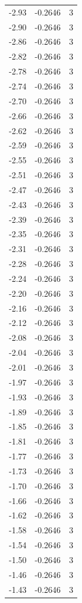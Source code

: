 \begin{longtable}{lrr}
  -2.93 & -0.2646 & 3 \\
  -2.90 & -0.2646 & 3 \\
  -2.86 & -0.2646 & 3 \\
  -2.82 & -0.2646 & 3 \\
  -2.78 & -0.2646 & 3 \\
  -2.74 & -0.2646 & 3 \\
  -2.70 & -0.2646 & 3 \\
  -2.66 & -0.2646 & 3 \\
  -2.62 & -0.2646 & 3 \\
  -2.59 & -0.2646 & 3 \\
  -2.55 & -0.2646 & 3 \\
  -2.51 & -0.2646 & 3 \\
  -2.47 & -0.2646 & 3 \\
  -2.43 & -0.2646 & 3 \\
  -2.39 & -0.2646 & 3 \\
  -2.35 & -0.2646 & 3 \\
  -2.31 & -0.2646 & 3 \\
  -2.28 & -0.2646 & 3 \\
  -2.24 & -0.2646 & 3 \\
  -2.20 & -0.2646 & 3 \\
  -2.16 & -0.2646 & 3 \\
  -2.12 & -0.2646 & 3 \\
  -2.08 & -0.2646 & 3 \\
  -2.04 & -0.2646 & 3 \\
  -2.01 & -0.2646 & 3 \\
  -1.97 & -0.2646 & 3 \\
  -1.93 & -0.2646 & 3 \\
  -1.89 & -0.2646 & 3 \\
  -1.85 & -0.2646 & 3 \\
  -1.81 & -0.2646 & 3 \\
  -1.77 & -0.2646 & 3 \\
  -1.73 & -0.2646 & 3 \\
  -1.70 & -0.2646 & 3 \\
  -1.66 & -0.2646 & 3 \\
  -1.62 & -0.2646 & 3 \\
  -1.58 & -0.2646 & 3 \\
  -1.54 & -0.2646 & 3 \\
  -1.50 & -0.2646 & 3 \\
  -1.46 & -0.2646 & 3 \\
  -1.43 & -0.2646 & 3 \\

\end{longtable}

